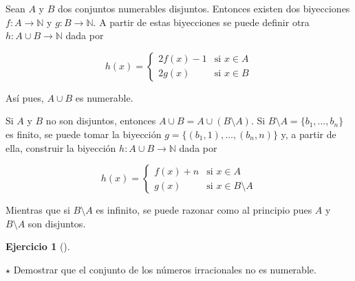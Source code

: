 \documentclass[
  a4paper,
]{scrreport}
\theoremstyle{definition}
\newtheorem{exercise}{Ejercicio}[chapter]
\theoremstyle{remark}
\begin{document}
\begin{tcolorbox}[enhanced jigsaw, left=2mm, arc=.35mm, coltitle=black, toprule=.15mm, colback=white, breakable, bottomrule=.15mm, colbacktitle=quarto-callout-tip-color!10!white, bottomtitle=1mm, toptitle=1mm, opacityback=0, titlerule=0mm, opacitybacktitle=0.6, title=\textcolor{quarto-callout-tip-color}{\faLightbulb}\hspace{0.5em}{Solución}, rightrule=.15mm, leftrule=.75mm, colframe=quarto-callout-tip-color-frame]

Sean \(A\) y \(B\) dos conjuntos numerables disjuntos. Entonces existen
dos biyecciones \(f:A\to \mathbb{N}\) y \(g:B\to \mathbb{N}\). A partir
de estas biyecciones se puede definir otra \(h:A\cup B\to \mathbb{N}\)
dada por

\[h(x)=
\begin{cases}
2f(x)-1 & \mbox{si } x\in A\\
2g(x) & \mbox{si } x\in B
\end{cases}
\]

Así pues, \(A\cup B\) es numerable.

Si \(A\) y \(B\) no son disjuntos, entonces
\(A\cup B=A\cup (B\setminus A)\). Si
\(B\setminus A=\{b_1,\ldots, b_n\}\) es finito, se puede tomar la
biyección \(g=\{(b_1,1),\ldots,(b_n,n)\}\) y, a partir de ella,
construir la biyección \(h:A\cup B\to \mathbb{N}\) dada por

\[h(x)=
\begin{cases}
f(x)+n & \mbox{si } x\in A\\
g(x) & \mbox{si } x\in B\setminus A
\end{cases}
\]

Mientras que si \(B\setminus A\) es infinito, se puede razonar como al
principio pues \(A\) y \(B\setminus A\) son disjuntos.

\end{tcolorbox}

\leavevmode{}%
\begin{exercise}[]\label{exr-irracionales-no-numerables}

\(\star\) Demostrar que el conjunto de los números irracionales no es
numerable.

\end{exercise}
\end{document}
